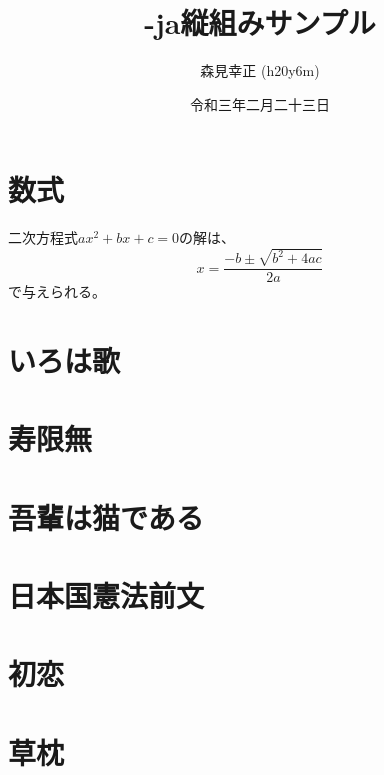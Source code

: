 \documentclass[a4paper,twocolumn]{article}
\title{\XeLaTeX-ja縦組みサンプル}
\author{森見幸正 (h20y6m)}
\date{令和三年二月二十三日}
\begin{document}
\maketitle

\section{数式}

二次方程式$ax^2+bx+c=0$の解は、
\[ x = \frac{-b\pm\sqrt{b^2+4ac}}{2a} \]
で与えられる。

\section{いろは歌}

\section{寿限無}

\section{吾輩は猫である}

\section{日本国憲法前文}

\section{初恋}

\section{草枕}
\end{document}
